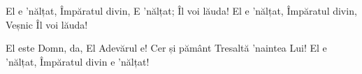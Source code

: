 \beginverse
El e ’nălțat, Împăratul divin,
E ’nălțat; Îl voi lăuda!
El e ’nălțat, Împăratul divin,
Veșnic Îl voi lăuda!
\endverse

\beginverse
El este Domn, da, El Adevărul e!
Cer și pământ
Tresaltă ’naintea Lui!
El e ’nălțat,
Împăratul divin e ’nălțat!
\endverse
\endsong